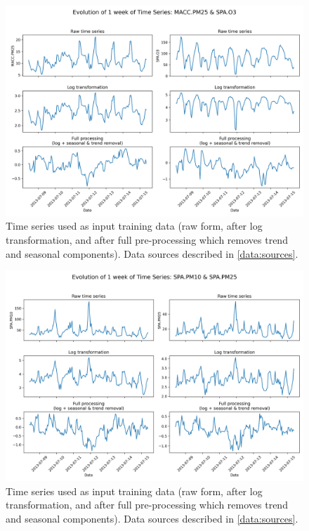 \documentclass[12pt,a4paper]{book}
\begin{document}
\begin{figure}[h]
  \centering  
  \includegraphics[width=\textwidth]{time_series_page_5.png}
  \caption{Time series used as input training data (raw form, after log transformation, and after full pre-processing which removes trend and seasonal components). Data sources described in \ref{data:sources}.}
  \label{fig:evo_ts5}
\end{figure}

\begin{figure}[h]
  \centering  
  \includegraphics[width=\textwidth]{time_series_page_6.png}
  \caption{Time series used as input training data (raw form, after log transformation, and after full pre-processing which removes trend and seasonal components). Data sources described in \ref{data:sources}.}
  \label{fig:evo_ts6}
\end{figure}
\end{document}
